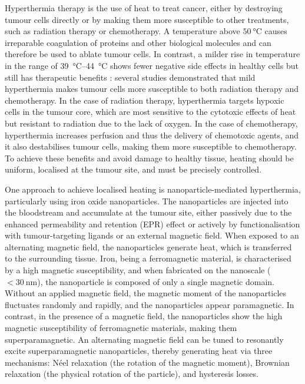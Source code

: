 \documentclass[Times1COL,AMA]{WileyNJDv5} %
\begin{document}
Hyperthermia therapy is the use of heat to treat cancer, either by destroying tumour cells directly or by making them more susceptible to other treatments, such as radiation therapy or chemotherapy. \cite{Chatterjee2011}
A temperature above $\SI{50}{\celsius}$ causes irreparable coagulation of proteins and other biological molecules and can therefore be used to ablate tumour cells. \cite{Lu2009}
In contrast, a milder rise in temperature in the range of \SIrange{39}{44}{\celsius} shows fewer negative side effects in healthy cells but still has therapeutic benefits \cite{Kaur2016}:
several studies \cite{Jones2005,Issels2010,Herman2013} demonstrated that mild hyperthermia makes tumour cells more susceptible to both radiation therapy and chemotherapy.
In the case of radiation therapy, hyperthermia targets hypoxic cells in the tumour core, which are most sensitive to the cytotoxic effects of heat but resistant to radiation due to the lack of oxygen. \cite{Refaat2015}
In the case of chemotherapy, hyperthermia increases perfusion and thus the delivery of chemotoxic agents, and it also destabilises tumour cells, making them more susceptible to chemotherapy. \cite{Quinto2015}
To achieve these benefits and avoid damage to healthy tissue, heating should be uniform, localised at the tumour site, and must be precisely controlled.

One approach to achieve localised heating is nanoparticle-mediated hyperthermia, particularly using iron oxide nanoparticles. \cite{Palzer2021,Vassallo2023}
The nanoparticles are injected into the bloodstream and accumulate at the tumour site, either passively due to the enhanced permeability and retention (EPR) effect or actively by functionalisation with tumour-targeting ligands or an external magnetic field. \cite{Wilhelm2016}
When exposed to an alternating magnetic field, the nanoparticles generate heat, which is transferred to the surrounding tissue.
Iron, being a ferromagnetic material, is characterised by a high magnetic susceptibility, and when fabricated on the nanoscale ($<\SI{30}{\nano\meter}$), the nanoparticle is composed of only a single magnetic domain.
Without an applied magnetic field, the magnetic moment of the nanoparticles fluctuates randomly and rapidly, and the nanoparticles appear paramagnetic.
In contrast, in the presence of a magnetic field, the nanoparticles show the high magnetic susceptibility of ferromagnetic materials, making them superparamagnetic. \cite{Kaur2016}
An alternating magnetic field can be tuned to resonantly excite superparamagnetic nanoparticles, thereby generating heat via three mechanisms:
Néel relaxation (the rotation of the magnetic moment), Brownian relaxation (the physical rotation of the particle), and hysteresis losses. \cite{Nuzhina2019}
\end{document}
